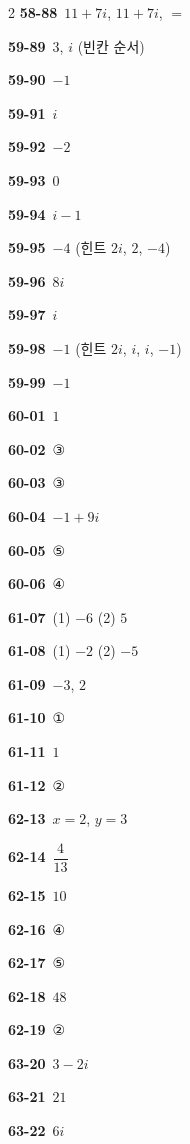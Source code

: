 \documentclass[10pt,a4paper]{article}
\begin{document}
\begin{multicols}{2}
\noindent\textbf{58-88}\ $11+7i$, $11+7i$, $=$\par
\noindent\textbf{59-89}\ $3$, $i$ (빈칸 순서)\par
\noindent\textbf{59-90}\ $-1$\par
\noindent\textbf{59-91}\ $i$\par
\noindent\textbf{59-92}\ $-2$\par
\noindent\textbf{59-93}\ $0$\par
\noindent\textbf{59-94}\ $i-1$\par
\noindent\textbf{59-95}\ $-4$ (힌트 $2i$, $2$, $-4$)\par
\noindent\textbf{59-96}\ $8i$\par
\noindent\textbf{59-97}\ $i$\par
\noindent\textbf{59-98}\ $-1$ (힌트 $2i$, $i$, $i$, $-1$)\par
\noindent\textbf{59-99}\ $-1$\par
\noindent\textbf{60-01}\ $1$\par
\noindent\textbf{60-02}\ ③\par
\noindent\textbf{60-03}\ ③\par
\noindent\textbf{60-04}\ $-1+9i$\par
\noindent\textbf{60-05}\ ⑤\par
\noindent\textbf{60-06}\ ④\par
\noindent\textbf{61-07}\ (1) $-6$ (2) $5$\par
\noindent\textbf{61-08}\ (1) $-2$ (2) $-5$\par
\noindent\textbf{61-09}\ $-3$, $2$\par
\noindent\textbf{61-10}\ ①\par
\noindent\textbf{61-11}\ $1$\par
\noindent\textbf{61-12}\ ②\par
\noindent\textbf{62-13}\ $x=2$, $y=3$\par
\noindent\textbf{62-14}\ $\dfrac{4}{13}$\par
\noindent\textbf{62-15}\ $10$\par
\noindent\textbf{62-16}\ ④\par
\noindent\textbf{62-17}\ ⑤\par
\noindent\textbf{62-18}\ $48$\par
\noindent\textbf{62-19}\ ②\par
\noindent\textbf{63-20}\ $3-2i$\par
\noindent\textbf{63-21}\ $21$\par
\noindent\textbf{63-22}\ $6i$\par

\end{multicols}
\end{document}
